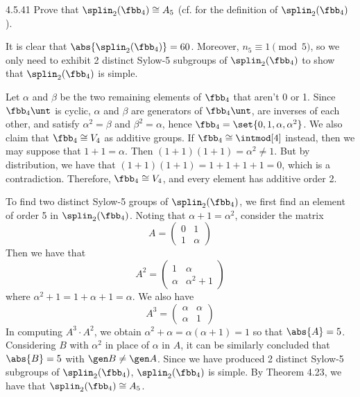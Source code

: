 \begin{exercise}{4.5.41}
	Prove that $\splin_2(\fbb_4) \cong A_5$ (cf.  for the definition of $\splin_2(\fbb_4)$).
\end{exercise}

\begin{sol}
	It is clear that $\abs{\splin_2(\fbb_4)} = 60$.
	Moreover, $n_5 \equiv 1 \pmod 5$, so we only need to exhibit 2 distinct Sylow-5 subgroups of $\splin_2(\fbb_4)$ to show that $\splin_2(\fbb_4)$ is simple.

	Let $\alpha$ and $\beta$ be the two remaining elements of $\fbb_4$ that aren't 0 or 1.
	Since $\fbb_4\unt$ is cyclic, $\alpha$ and $\beta$ are generators of $\fbb_4\unt$, are inverses of each other, and satisfy $\alpha^2 = \beta$ and $\beta^2 = \alpha$, hence $\fbb_4 = \set{0, 1, \alpha, \alpha^2}$.
	We also claim that $\fbb_4 \cong V_4$ as additive groups.
	If $\fbb_4 \cong \intmod[4]$ instead, then we may suppose that $1 + 1 = \alpha$.
	Then $(1 + 1)(1 + 1) = \alpha^2 \neq 1$.
	But by distribution, we have that $(1 + 1)(1 + 1) = 1 + 1 + 1 + 1 = 0$, which is a contradiction.
	Therefore, $\fbb_4 \cong V_4$, and every element has additive order 2.

	To find two distinct Sylow-5 groups of $\splin_2(\fbb_4)$, we first find an element of order 5 in $\splin_2(\fbb_4)$.
	Noting that $\alpha + 1 = \alpha^2$, consider the matrix
	\[
		A =
		\begin{pmatrix}
			0 & 1 \\
			1 & \alpha
		\end{pmatrix}
	\]
	Then we have that
	\[
		A^2 =
		\begin{pmatrix}
			1 & \alpha \\
			\alpha & \alpha^2 + 1
		\end{pmatrix}
	\]
	where $\alpha^2 + 1 = 1 + \alpha + 1 = \alpha$.
	We also have
	\[
		A^3 =
		\begin{pmatrix}
			\alpha & \alpha \\
			\alpha & 1
		\end{pmatrix}
	\]
	In computing $A^3 \cdot A^2$, we obtain $\alpha^2 + \alpha = \alpha(\alpha + 1) = 1$ so that $\abs{A} = 5$.
	Considering $B$ with $\alpha^2$ in place of $\alpha$ in $A$, it can be similarly concluded that $\abs{B} = 5$ with $\gen B \neq \gen A$.
	Since we have produced 2 distinct Sylow-5 subgroups of $\splin_2(\fbb_4)$, $\splin_2(\fbb_4)$ is simple.
	By Theorem 4.23, we have that $\splin_2(\fbb_4) \cong A_5$.
\end{sol}

